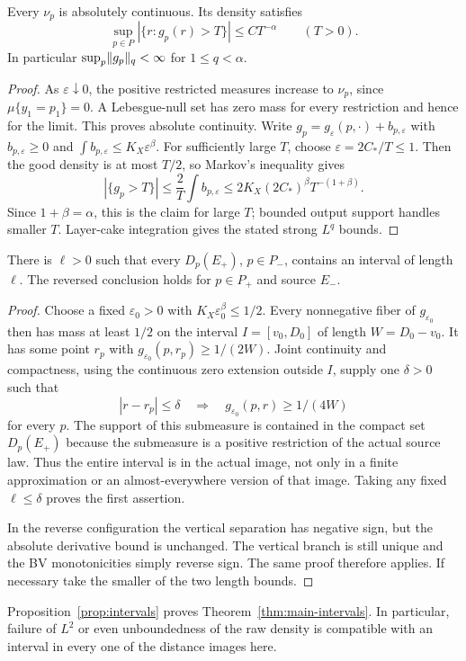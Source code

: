 \begin{corollary}
\label{cor:weak}
Every $\nu_p$ is absolutely continuous. Its density satisfies
\begin{equation}\label{eq:weak-alpha}
 \sup_{p\in P}|\{r:g_p(r)>T\}|\leq C T^{-\alpha}
 \qquad(T>0).
\end{equation}
In particular $\sup_p\lVert g_p\rVert_q<\infty$ for $1\leq q<\alpha$.
\end{corollary}
\begin{proof}
As $\varepsilon\downarrow0$, the positive restricted measures increase
to $\nu_p$, since $\mu\{y_1=p_1\}=0$. A Lebesgue-null set has zero
mass for every restriction and hence for the limit. This proves absolute
continuity. Write $g_p=g_\varepsilon(p,\cdot)+b_{p,\varepsilon}$ with
$b_{p,\varepsilon}\geq0$ and
$\int b_{p,\varepsilon}\leq K_X\varepsilon^\beta$.
For sufficiently large $T$, choose $\varepsilon=2C_*/T\leq1$.
Then the good density is at most $T/2$, so Markov's inequality gives
\[
 |\{g_p>T\}|\leq\frac2T\int b_{p,\varepsilon}
 \leq2K_X(2C_*)^\beta T^{-(1+\beta)}.
\]
Since $1+\beta=\alpha$, this is the claim for large $T$; bounded output
support handles smaller $T$. Layer-cake integration gives the stated
strong $L^q$ bounds.
\end{proof}

\begin{proposition}
\label{prop:intervals}
There is $\ell>0$ such that every $D_p(E_+)$, $p\in P_-$, contains
an interval of length $\ell$. The reversed conclusion holds for
$p\in P_+$ and source $E_-$.
\end{proposition}
\begin{proof}
Choose a fixed $\varepsilon_0>0$ with
$K_X\varepsilon_0^\beta\leq1/2$. Every nonnegative fiber of
$g_{\varepsilon_0}$ then has mass at least $1/2$ on the interval
$I=[v_0,D_0]$ of length $W=D_0-v_0$. It has some point $r_p$ with
$g_{\varepsilon_0}(p,r_p)\geq1/(2W)$. Joint continuity and compactness,
using the continuous zero extension outside $I$, supply one $\delta>0$
such that
\[
 |r-r_p|\leq\delta\quad\Longrightarrow\quad
 g_{\varepsilon_0}(p,r)\geq1/(4W)
\]
for every $p$. The support of this submeasure is contained in the compact
set $D_p(E_+)$ because the submeasure is a positive restriction of the
actual source law. Thus the entire interval is in the actual image, not
only in a finite approximation or an almost-everywhere version of that
image. Taking any fixed $\ell\leq\delta$ proves the first assertion.

In the reverse configuration the vertical separation has negative sign,
but the absolute derivative bound is unchanged. The vertical branch is
still unique and the BV monotonicities simply reverse sign. The same proof
therefore applies. If necessary take the smaller of the two length bounds.
\end{proof}
Proposition~\ref{prop:intervals} proves Theorem~\ref{thm:main-intervals}.
In particular, failure of $L^2$ or even unboundedness of the raw density
is compatible with an interval in every one of the distance images here.
